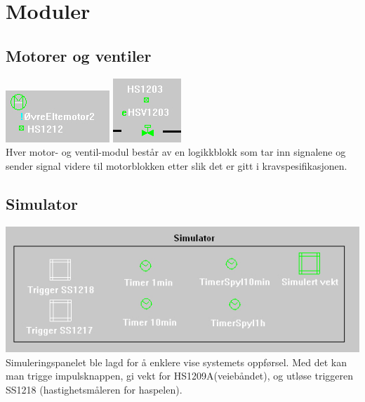 \section{Moduler}
\subsection{Motorer og ventiler}
	\includegraphics[scale=1.2]{motmod2.jpg}
	\includegraphics[scale=1.2]{ventmod2.jpg}
	\\Hver motor- og ventil-modul består av en logikkblokk som tar inn signalene og sender signal videre til motorblokken etter slik det er gitt i kravspesifikasjonen.

\subsection{Simulator}
	\includegraphics[width=\textwidth]{simulator2.jpg}
	Simuleringspanelet ble lagd for å enklere vise systemets oppførsel. Med det kan man trigge impulsknappen, gi vekt for HS1209A(veiebåndet), og utløse triggeren SS1218 (hastighetsmåleren for haspelen).
